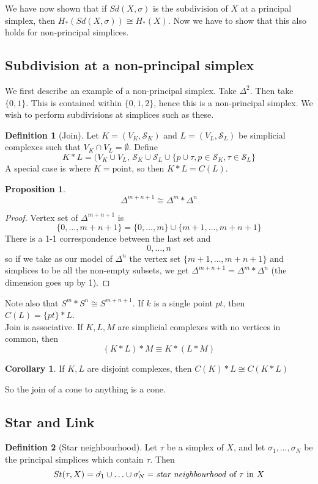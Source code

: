 \documentclass[a4paper,14pt]{extarticle}
\theoremstyle{definition}
\newtheorem*{definition}{Definition}
\newtheorem*{corollary}{Corollary}
\newtheorem*{proposition}{Proposition}
\begin{document}
We have now shown that if $Sd(X,\sigma)$ is the subdivision of $X$ at a principal simplex,
then $H_*(Sd(X,\sigma))\cong H_*(X)$. Now we have to show that this also holds for
non-principal simplices.

\subsection{Subdivision at a non-principal simplex}
We first describe an example of a non-principal simplex. Take $\Delta^2$. Then take $\{0,1\}$.
This is contained within $\{0,1,2\}$, hence this is a non-principal simplex. We wish to 
perform subdivisions at simplices such as these.
\begin{definition}[Join]
	Let $K=(V_K,\mathcal{S}_K)$ and $L=(V_L,\mathcal{S}_L)$ be simplicial complexes such that
	$V_K\cap V_L=\emptyset$. Define 
	\[K*L=(V_K\cup V_L, \,\mathcal{S}_K\cup\mathcal{S}_L\cup\{p\cup\tau, p\in\mathcal{S}_K,\tau\in\mathcal{S}_L\}\]
	A special case is where $K=\text{point}$, so then $K*L=C(L)$.
\end{definition}

\begin{proposition}
	\[\Delta^{m+n+1}\cong\Delta^m*\Delta^n\]
\end{proposition}

\begin{proof}
	Vertex set of $\Delta^{m+n+1}$ is \[\{0,\ldots,m+n+1\}=\{0,\ldots,m\}\cup\{m+1,\ldots,m+n+1\}\] There is a 1-1 correspondence between the last set and \[0,\ldots,n\] so if we take 
	as our model of $\Delta^n$ the vertex set $\{m+1,\ldots,m+n+1\}$ and simplices to be all the
	non-empty subsets, we get $\Delta^{m+n+1}=\Delta^m*\Delta^n$ (the dimension goes up by 1).
\end{proof}

Note also that $S^m*S^n\cong S^{m+n+1}$. If $k$ is a single point $pt$, then
$C(L)=\{pt\}*L$. \\

Join is associative. If $K,L,M$ are simplicial complexes with no vertices in common, then
\[(K*L)*M\equiv K*(L*M)\]

\begin{corollary}
	If $K,L$ are disjoint complexes, then $C(K)*L\cong C(K*L)$
\end{corollary}
So the join of a cone to anything is a cone.

\subsection{Star and Link}
\begin{definition}[Star neighbourhood]
	Let $\tau$ be a simplex of $X$, and let $\sigma_1,\ldots,\sigma_N$ be the principal
	simplices which contain $\tau$. Then 
	\[St(\tau,X)=\hat{\sigma_1}\cup\ldots\cup\hat{\sigma_N}=\text{\emph{star neighbourhood} of $\tau$ 
	in $X$}\]
\end{definition}
\end{document}
